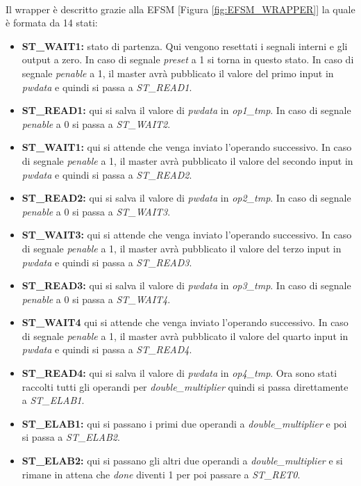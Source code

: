 \documentclass[]{IEEEtran}
\begin{document}
\\Il wrapper è descritto grazie alla EFSM [Figura \ref{fig:EFSM_WRAPPER}] la quale è formata da 14 stati:
\begin{itemize}
    \item \textbf{ST\_WAIT1:} stato di partenza. Qui vengono resettati i segnali interni e gli output a zero. In caso di segnale \textit{preset} a 1 si torna in questo stato. In caso di segnale \textit{penable} a 1, il master avrà pubblicato il valore del primo input in \textit{pwdata} e quindi si passa a \textit{ST\_READ1}.
    \item \textbf{ST\_READ1:} qui si salva il valore di \textit{pwdata} in \textit{op1\_tmp}. In caso di segnale \textit{penable} a 0 si passa a \textit{ST\_WAIT2}.
    \item \textbf{ST\_WAIT1:} qui si attende che venga inviato l'operando successivo. In caso di segnale \textit{penable} a 1, il master avrà pubblicato il valore del secondo input in \textit{pwdata} e quindi si passa a \textit{ST\_READ2}.
    \item \textbf{ST\_READ2:} qui si salva il valore di \textit{pwdata} in \textit{op2\_tmp}. In caso di segnale \textit{penable} a 0 si passa a \textit{ST\_WAIT3}.
    \item \textbf{ST\_WAIT3:} qui si attende che venga inviato l'operando successivo. In caso di segnale \textit{penable} a 1, il master avrà pubblicato il valore del terzo input in \textit{pwdata} e quindi si passa a \textit{ST\_READ3}.
    \item \textbf{ST\_READ3:} qui si salva il valore di \textit{pwdata} in \textit{op3\_tmp}. In caso di segnale \textit{penable} a 0 si passa a \textit{ST\_WAIT4}.
    \item \textbf{ST\_WAIT4} qui si attende che venga inviato l'operando successivo. In caso di segnale \textit{penable} a 1, il master avrà pubblicato il valore del quarto input in \textit{pwdata} e quindi si passa a \textit{ST\_READ4}.
    \item \textbf{ST\_READ4:} qui si salva il valore di \textit{pwdata} in \textit{op4\_tmp}. Ora sono stati raccolti tutti gli operandi per \textit{double\_multiplier} quindi si passa direttamente a \textit{ST\_ELAB1}.
    \item \textbf{ST\_ELAB1:} qui si passano i primi due operandi a \textit{double\_multiplier} e poi si passa a \textit{ST\_ELAB2}.
    \item \textbf{ST\_ELAB2:} qui si passano gli altri due operandi a \textit{double\_multiplier} e si rimane in attena che \textit{done} diventi 1 per poi passare a \textit{ST\_RET0}.

\end{itemize}
\end{document}
